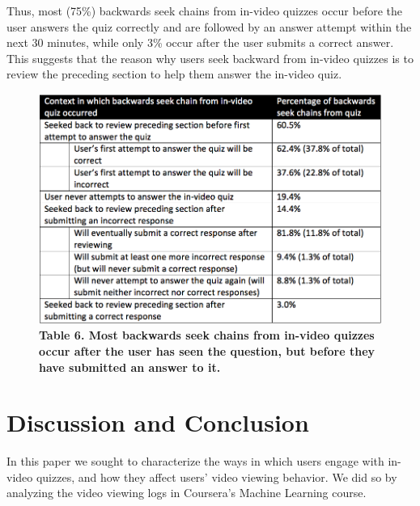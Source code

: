 \documentclass{sigchi}
\begin{document}
Thus, most (75\%) backwards seek chains from in-video quizzes occur before the user answers the quiz correctly and are followed by an answer attempt within the next 30 minutes, while only 3\% occur after the user submits a correct answer. This suggests that the reason why users seek backward from in-video quizzes is to review the preceding section to help them answer the in-video quiz.


\begin{figure}
\includegraphics[width=1.0\columnwidth]{backseeks-and-quizzes}
\small{\textbf{Table 6. Most backwards seek chains from in-video quizzes occur after the user has seen the question, but before they have submitted an answer to it.}}
\label{fig:backseeks-and-quizzes}
\end{figure}

\section{Discussion and Conclusion}

In this paper we sought to characterize the ways in which users engage with in-video quizzes, and how they affect users' video viewing behavior. We did so by analyzing the video viewing logs in Coursera's Machine Learning course.
\end{document}
